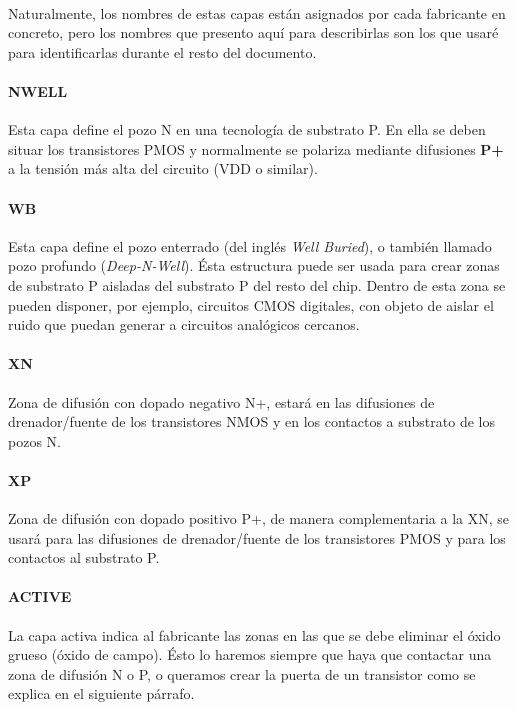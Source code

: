 \paragraph{}
Naturalmente, los nombres de estas capas están asignados por cada fabricante en
concreto, pero los nombres que presento aquí para describirlas son los que usaré
para identificarlas durante el resto del documento.

\paragraph{NWELL}
Esta capa define el pozo N en una tecnología de substrato P. En ella se deben
situar los transistores PMOS y normalmente se polariza mediante difusiones \textbf{P+}
a la tensión más alta del circuito (VDD o similar).

\paragraph{WB}
Esta capa define el pozo enterrado (del inglés \textit{Well Buried}), o también
llamado pozo profundo (\textit{Deep-N-Well}). Ésta estructura
puede ser usada para crear zonas de substrato P aisladas del substrato
P del resto del chip. Dentro de esta zona se pueden disponer, por ejemplo, circuitos
CMOS digitales, con objeto de aislar el ruido que puedan generar a circuitos analógicos
cercanos.

\paragraph{XN}
Zona de difusión con dopado negativo N+, estará en las difusiones de drenador/fuente
de los transistores NMOS y en los contactos a substrato de los pozos N.

\paragraph{XP}
Zona de difusión con dopado positivo P+, de manera complementaria a la XN,
se usará para las difusiones de drenador/fuente
de los transistores PMOS y para los contactos al substrato P.

\paragraph{ACTIVE}
La capa activa indica al fabricante las zonas en las que se debe eliminar el óxido grueso (óxido
de campo). Ésto lo haremos siempre que haya que contactar una zona de difusión N o P,
o queramos crear la puerta de un transistor como se explica en el siguiente párrafo.

